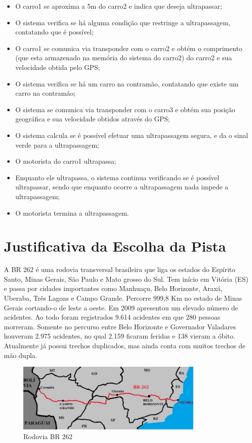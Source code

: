 \begin{itemize}
	\item O carro1 se aproxima a 5m do carro2 e indica que deseja ultrapassar;
	\item O sistema verifica se há alguma condição que restringe a ultrapassagem, contatando que é possível;
	\item O carro1 se comunica via transponder com o carro2 e obtém o comprimento (que esta armazenado na memória do sistema do carro2) do carro2 e sua velocidade obtida pelo GPS;
	\item O sistema verifica se há um carro na contramão, contatando que existe um carro na contramão;
	\item O sistema se comunica via transponder com o carro3 e obtém sua posição geográfica e sua velocidade obtidos através do GPS;
	\item O sistema calcula se é possível efetuar uma ultrapassagem segura, e da o sinal verde para a ultrapassagem;
	\item O motorista do carro1 ultrapassa;
	\item Enquanto ele ultrapassa, o sistema continua verificando se é possível ultrapassar, sendo que enquanto ocorre a ultrapassagem nada impede a ultrapassagem;
	\item O motorista termina a ultrapassagem.
\end{itemize}

\section{Justificativa da Escolha da Pista}

A BR 262 é uma rodovia transversal brasileira que liga os estados do Espírito Santo, Minas Gerais, São Paulo e Mato grosso do Sul. Tem início em Vitória (ES) e passa por cidades importantes como Manhuaçu, Belo Horizonte, Araxá, Uberaba, Três Lagoas e Campo Grande. Percorre 999,8 Km no estado de Minas Gerais cortando-o de leste a oeste. Em 2009 apresentou um elevado número de acidentes. Ao todo foram registrados 9.614 acidentes em que 280 pessoas morreram. Somente no percurso entre Belo Horizonte e Governador Valadares houveram 2.975 acidentes, no qual 2.159 ficaram feridas e 138 vieram a óbito. Atualmente já possui trechos duplicados, mas ainda conta com muitos trechos de mão dupla. 

\begin{figure}[h]
  \centering
  \includegraphics[width=350px, scale=1]{figuras/mapa}
  \caption{Rodovia BR 262}
\label{fig:mapa}
\end{figure}

